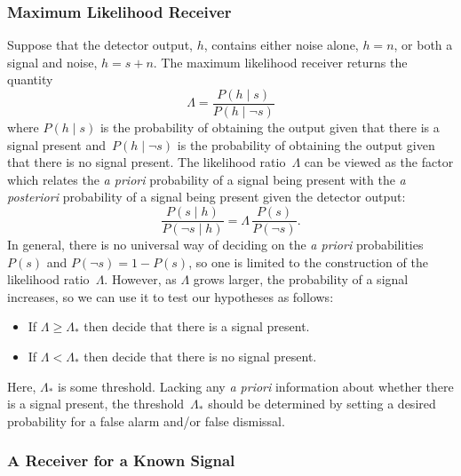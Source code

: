 \subsubsection{Maximum Likelihood Receiver}

Suppose that the detector output, $h$, contains either noise alone, $h=n$, or
both a signal and noise, $h=s+n$.  The maximum likelihood receiver returns
the quantity
\begin{equation}
  \Lambda = \frac{P(h\mid s)}{P(h\mid\neg s)}
\end{equation}
where $P(h\mid s)$ is the probability of obtaining the output given that there
is a signal present and~$P(h\mid\neg s)$ is the probability of obtaining the
output given that there is no signal present.  The likelihood ratio~$\Lambda$
can be viewed as the factor which relates the \emph{a priori} probability
of a signal being present with the \emph{a posteriori} probability of a signal
being present given the detector output:
\begin{equation}
  \frac{P(s\mid h)}{P(\neg s\mid h)} = \Lambda\,\frac{P(s)}{P(\neg s)}.
\end{equation}
In general, there is no universal way of deciding on the \emph{a priori}
probabilities $P(s)$ and $P(\neg s)=1-P(s)$, so one is limited to the
construction of the likelihood ratio~$\Lambda$.  However, as $\Lambda$ grows
larger, the probability of a signal increases, so we can use it to test our
hypotheses as follows:
\begin{itemize}
  \item If $\Lambda\ge\Lambda_\ast$ then decide that there is a signal present.
  \item If $\Lambda<\Lambda_\ast$ then decide that there is no signal present.
\end{itemize}
Here, $\Lambda_\ast$ is some threshold.
Lacking any \emph{a priori} information about whether there is a signal
present, the threshold~$\Lambda_\ast$ should be determined by setting a
desired probability for a false alarm and/or false dismissal.

\subsubsection{A Receiver for a Known Signal}


